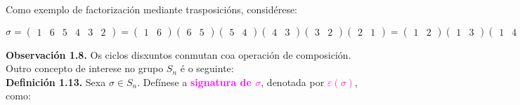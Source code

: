\documentclass[twoside]{report}
\theoremstyle{mystyle}
\begin{document}
\vspace{5mm}

\noindent Como exemplo de factorización mediante trasposicións, considérese:

$$
\sigma = 
\begin{pmatrix}
1 & 6 & 5 & 4 & 3 & 2
\end{pmatrix}
= 
\begin{pmatrix}
1 & 6
\end{pmatrix}
\begin{pmatrix}
6 & 5
\end{pmatrix}
\begin{pmatrix}
5 & 4
\end{pmatrix}
\begin{pmatrix}
4 & 3
\end{pmatrix}
\begin{pmatrix}
3 & 2
\end{pmatrix}
\begin{pmatrix}
2 & 1
\end{pmatrix}
= 
\begin{pmatrix}
1 & 2
\end{pmatrix}
\begin{pmatrix}
1 & 3
\end{pmatrix}
\begin{pmatrix}
1 & 4
\end{pmatrix}
\begin{pmatrix}
1 & 5
\end{pmatrix}
\begin{pmatrix}
1 & 6
\end{pmatrix}
$$

\vspace{4mm}

\noindent \textbf{Observación 1.8.} Os ciclos disxuntos conmutan coa operación de composición. \\

\noindent Outro concepto de interese no grupo $S_{n}$ é o seguinte: \\

\noindent \textbf{Definición 1.13.} Sexa $\sigma \in S_{n}$. Defínese a \textcolor{magenta}{\textbf{signatura de $\sigma$}}, denotada por \textcolor{magenta}{$\varepsilon(\sigma)$}, como:

\begin{center}
\end{center}
\end{document}

